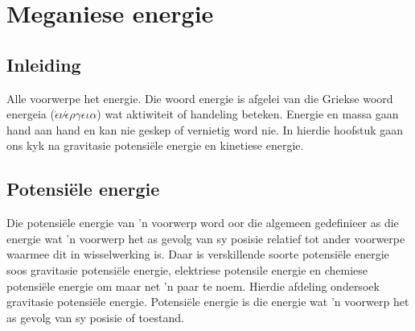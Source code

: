 \chapter{Meganiese energie} \label{chap:energy}
    \setcounter{figure}{1}
    \setcounter{subfigure}{1}
    \label{1fc5ba69690764517c30802fdf7b1905}
         \section{Inleiding}
    \nopagebreak
            \label{m38784*id7521}
Alle voorwerpe het energie. Die woord energie is afgelei van die Griekse woord energeia ($\acute{\epsilon} \nu \acute{\epsilon} \rho \gamma \epsilon \iota \alpha $) wat aktiwiteit of handeling beteken. Energie en massa gaan hand aan hand en kan nie geskep of vernietig word nie. In hierdie hoofstuk gaan ons kyk na gravitasie potensiële energie en kinetiese energie. \label{m38784*cid4}


\section{Potensi\"{e}le energie}
            \nopagebreak
Die potensi\"{e}le energie van  'n voorwerp word oor die algemeen gedefinieer as die energie wat  'n voorwerp het as gevolg van sy posisie relatief tot ander voorwerpe waarmee dit in wisselwerking is. Daar is verskillende soorte potensiële energie soos gravitasie potensi\"{e}le energie, elektriese potensile energie en chemiese potensiële energie om maar net  'n paar te noem. Hierdie afdeling ondersoek gravitasie potensi\"{e}le energie. 
 { Potensi\"{e}le energie is die energie wat  'n voorwerp het as gevolg van sy posisie of toestand.} 


